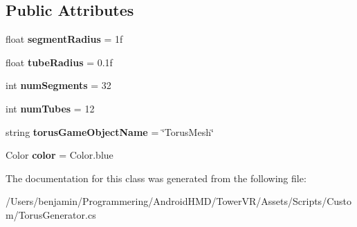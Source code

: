 \subsection*{Public Attributes}
\begin{DoxyCompactItemize}
\item 
float {\bfseries segment\+Radius} = 1f\hypertarget{class_torus_generator_aed33038eb45157a8feff1e38d07c09bb}{}\label{class_torus_generator_aed33038eb45157a8feff1e38d07c09bb}

\item 
float {\bfseries tube\+Radius} = 0.\+1f\hypertarget{class_torus_generator_a7cbc4daec94ddb0bfbbb2740eb19932c}{}\label{class_torus_generator_a7cbc4daec94ddb0bfbbb2740eb19932c}

\item 
int {\bfseries num\+Segments} = 32\hypertarget{class_torus_generator_ad259d2293d49c58c1ab23418cae7d462}{}\label{class_torus_generator_ad259d2293d49c58c1ab23418cae7d462}

\item 
int {\bfseries num\+Tubes} = 12\hypertarget{class_torus_generator_a7dbdd0f36b47f20ebdf8f235c1d3d27e}{}\label{class_torus_generator_a7dbdd0f36b47f20ebdf8f235c1d3d27e}

\item 
string {\bfseries torus\+Game\+Object\+Name} = \char`\"{}Torus\+Mesh\char`\"{}\hypertarget{class_torus_generator_a0be1daa18ad5c4aa772471ded8e65dbe}{}\label{class_torus_generator_a0be1daa18ad5c4aa772471ded8e65dbe}

\item 
Color {\bfseries color} = Color.\+blue\hypertarget{class_torus_generator_aa8bebfe24d304aa83881e1e676d3fa35}{}\label{class_torus_generator_aa8bebfe24d304aa83881e1e676d3fa35}

\end{DoxyCompactItemize}


The documentation for this class was generated from the following file\+:\begin{DoxyCompactItemize}
\item 
/\+Users/benjamin/\+Programmering/\+Android\+H\+M\+D/\+Tower\+V\+R/\+Assets/\+Scripts/\+Custom/Torus\+Generator.\+cs\end{DoxyCompactItemize}
